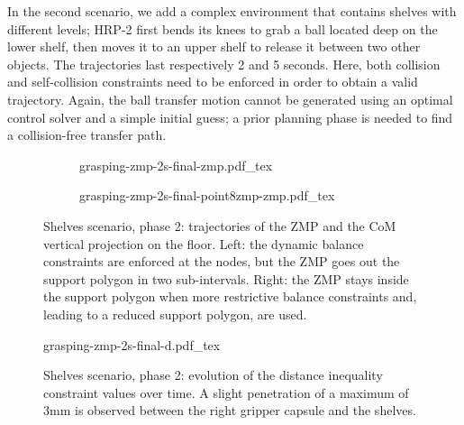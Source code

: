 In the second scenario, we add a complex environment that contains
shelves with different levels; HRP-2 first bends its knees to grab a
ball located deep on the lower shelf, then moves it to an upper shelf
to release it between two other objects. The trajectories last
respectively 2 and 5 seconds. Here, both collision and self-collision
constraints need to be enforced in order to obtain a valid
trajectory. Again, the ball transfer motion cannot be generated using
an optimal control solver and a simple initial guess; a prior planning
phase is needed to find a collision-free transfer path.

\begin{figure}
  \centering
  \begin{subfigure}{0.49\linewidth}
    \centering
        {\def\svgwidth{\linewidth}
          {\tiny
            
                       {grasping-zmp-2s-final-zmp.pdf_tex}
          }
        }
  \end{subfigure}
  \begin{subfigure}{0.49\linewidth}
    \centering
        {\def\svgwidth{\linewidth}
          {\tiny
            
                       {grasping-zmp-2s-final-point8zmp-zmp.pdf_tex}
          }
        }
  \end{subfigure}
  \caption{Shelves scenario, phase 2: trajectories of the ZMP and the
    CoM vertical projection on the floor. Left: the dynamic balance
    constraints are enforced at the nodes, but the ZMP goes out the
    support polygon in two sub-intervals. Right: the ZMP stays inside
    the support polygon when more restrictive balance constraints and,
    leading to a reduced support polygon, are used.}
  \label{fig:chap3-grasping-zmp-2s-final-zmp}
\end{figure}

\begin{figure}
  \centering
      {\def\svgwidth{0.8\linewidth}
        {\scriptsize
          
                     {grasping-zmp-2s-final-d.pdf_tex}
        }
      }
  \caption{Shelves scenario, phase 2: evolution of the distance
    inequality constraint values over time. A slight penetration of a
    maximum of 3mm is observed between the right gripper capsule and
    the shelves.}
  \label{fig:chap3-grasping-zmp-2s-final-d}
\end{figure}

